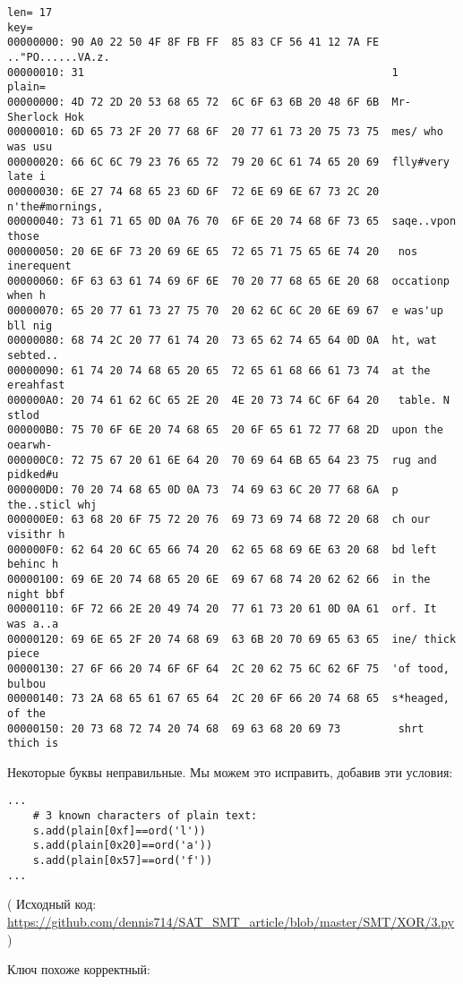 \begin{lstlisting}
len= 17
key=
00000000: 90 A0 22 50 4F 8F FB FF  85 83 CF 56 41 12 7A FE  .."PO......VA.z.
00000010: 31                                                1
plain=
00000000: 4D 72 2D 20 53 68 65 72  6C 6F 63 6B 20 48 6F 6B  Mr- Sherlock Hok
00000010: 6D 65 73 2F 20 77 68 6F  20 77 61 73 20 75 73 75  mes/ who was usu
00000020: 66 6C 6C 79 23 76 65 72  79 20 6C 61 74 65 20 69  flly#very late i
00000030: 6E 27 74 68 65 23 6D 6F  72 6E 69 6E 67 73 2C 20  n'the#mornings,
00000040: 73 61 71 65 0D 0A 76 70  6F 6E 20 74 68 6F 73 65  saqe..vpon those
00000050: 20 6E 6F 73 20 69 6E 65  72 65 71 75 65 6E 74 20   nos inerequent
00000060: 6F 63 63 61 74 69 6F 6E  70 20 77 68 65 6E 20 68  occationp when h
00000070: 65 20 77 61 73 27 75 70  20 62 6C 6C 20 6E 69 67  e was'up bll nig
00000080: 68 74 2C 20 77 61 74 20  73 65 62 74 65 64 0D 0A  ht, wat sebted..
00000090: 61 74 20 74 68 65 20 65  72 65 61 68 66 61 73 74  at the ereahfast
000000A0: 20 74 61 62 6C 65 2E 20  4E 20 73 74 6C 6F 64 20   table. N stlod
000000B0: 75 70 6F 6E 20 74 68 65  20 6F 65 61 72 77 68 2D  upon the oearwh-
000000C0: 72 75 67 20 61 6E 64 20  70 69 64 6B 65 64 23 75  rug and pidked#u
000000D0: 70 20 74 68 65 0D 0A 73  74 69 63 6C 20 77 68 6A  p the..sticl whj
000000E0: 63 68 20 6F 75 72 20 76  69 73 69 74 68 72 20 68  ch our visithr h
000000F0: 62 64 20 6C 65 66 74 20  62 65 68 69 6E 63 20 68  bd left behinc h
00000100: 69 6E 20 74 68 65 20 6E  69 67 68 74 20 62 62 66  in the night bbf
00000110: 6F 72 66 2E 20 49 74 20  77 61 73 20 61 0D 0A 61  orf. It was a..a
00000120: 69 6E 65 2F 20 74 68 69  63 6B 20 70 69 65 63 65  ine/ thick piece
00000130: 27 6F 66 20 74 6F 6F 64  2C 20 62 75 6C 62 6F 75  'of tood, bulbou
00000140: 73 2A 68 65 61 67 65 64  2C 20 6F 66 20 74 68 65  s*heaged, of the
00000150: 20 73 68 72 74 20 74 68  69 63 68 20 69 73         shrt thich is
\end{lstlisting}

Некоторые буквы неправильные.
Мы можем это исправить, добавив эти условия:

\begin{lstlisting}
...
    # 3 known characters of plain text:
    s.add(plain[0xf]==ord('l'))
    s.add(plain[0x20]==ord('a'))
    s.add(plain[0x57]==ord('f'))
...
\end{lstlisting}

( Исходный код: \url{https://github.com/dennis714/SAT_SMT_article/blob/master/SMT/XOR/3.py} )

Ключ похоже корректный:

